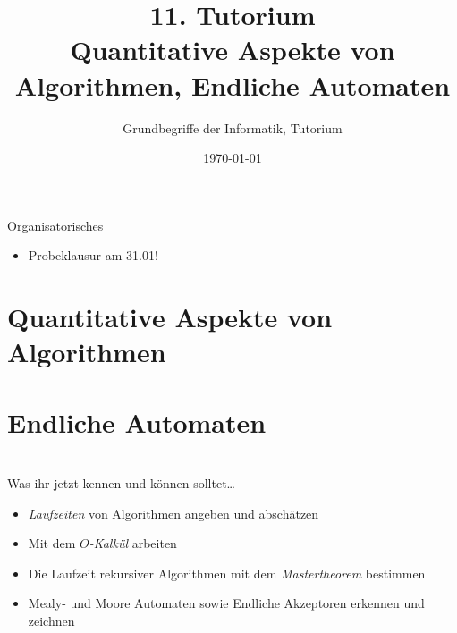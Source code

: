 




\usetikzlibrary{matrix}
\usetikzlibrary{arrows.meta}
\usetikzlibrary{automata}
\usetikzlibrary{tikzmark}

\title[Quantitative Aspekte von Algorithmen, Endliche Automaten]{11. Tutorium\\  Quantitative Aspekte von Algorithmen, Endliche Automaten}
\subtitle{Grundbegriffe der Informatik, Tutorium \hashtag\mytutnumber}
\date{\today}



\titleframe

\begin{frame}{Organisatorisches}
\begin{itemize}
    \item Probeklausur am 31.01!
\end{itemize}
\end{frame}

\roadmap



\section{Quantitative Aspekte von Algorithmen}


\section{Endliche Automaten}


\section{}
	\begin{frame}{Was ihr jetzt kennen und können solltet\dots}
			\begin{itemize}
				\item \emph{Laufzeiten} von Algorithmen angeben und abschätzen
				\item Mit dem \emph{$O$-Kalkül} arbeiten
				\item Die Laufzeit rekursiver Algorithmen mit dem \emph{Mastertheorem} bestimmen
				\item Mealy- und Moore Automaten sowie Endliche Akzeptoren erkennen und zeichnen
			\end{itemize}
	
	\end{frame}
